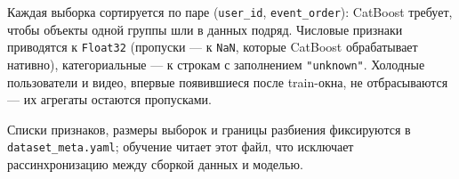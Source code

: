 Каждая выборка сортируется по паре (\texttt{user\_id}, \texttt{event\_order}): CatBoost требует, чтобы объекты одной группы шли в данных подряд.
Числовые признаки приводятся к \texttt{Float32} (пропуски --- к \texttt{NaN}, которые CatBoost обрабатывает нативно), категориальные --- к строкам с заполнением \texttt{"unknown"}.
Холодные пользователи и видео, впервые появившиеся после train-окна, не отбрасываются --- их агрегаты остаются пропусками.

Списки признаков, размеры выборок и границы разбиения фиксируются в \texttt{dataset\_meta.yaml}; обучение читает этот файл, что исключает рассинхронизацию между сборкой данных и моделью.
